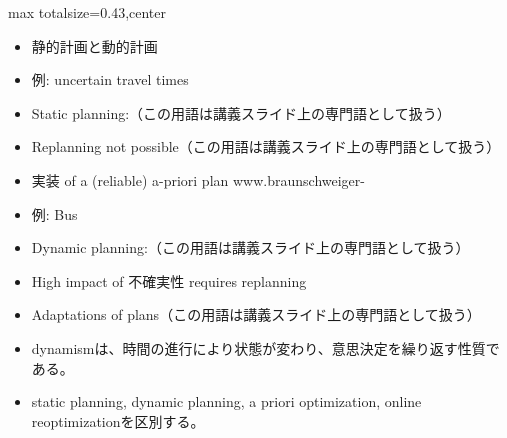 \clearpage
{}
\begin{minipage}[t]{0.405\textwidth}
\begin{adjustbox}{max totalsize={\textwidth}{0.43\textheight},center}
\begin{minipage}{\textwidth}\scriptsize
{}\begin{itemize}
\item 静的計画と動的計画
\item 例: uncertain travel times
\item Static planning:（この用語は講義スライド上の専門語として扱う）
\item Replanning not possible（この用語は講義スライド上の専門語として扱う）
\item 実装 of a (reliable) a-priori plan www.braunschweiger-
\item 例: Bus
\item Dynamic planning:（この用語は講義スライド上の専門語として扱う）
\item High impact of 不確実性 requires replanning
\item Adaptations of plans（この用語は講義スライド上の専門語として扱う）
\end{itemize}\begin{itemize}
\item dynamismは、時間の進行により状態が変わり、意思決定を繰り返す性質である。
\item static planning, dynamic planning, a priori optimization, online reoptimizationを区別する。
\end{itemize}
\end{minipage}
\end{adjustbox}
\end{minipage}\hfill
